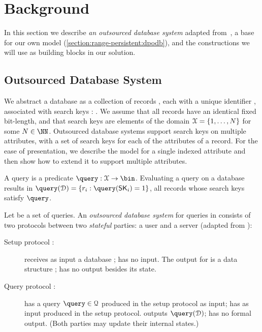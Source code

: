 \section{Background}\label{section:range-persistent:background}

	In this section we describe \emph{an outsourced database system} adapted from~\cite{generic-attacks-kellaris}, a base for our own model (\cref{section:range-persistent:dpodb}), and the constructions we will use as building blocks in our solution.

	\subsection{Outsourced Database System}

		We abstract a database as a collection of \dataSize{} records \record{}, each with a unique identifier \recordID{}, associated with search keys \searchKey{}: \databaseDef{}.
		We assume that all records have an identical fixed bit-length, and that search keys are elements of the domain $\mathcal{X} = \{ 1, \ldots, N \}$ for some $\domainSize \in \NN$.
		Outsourced database systems support search keys on multiple attributes, with a set of search keys for each of the attributes of a record.
		For the ease of presentation, we describe the model for a single indexed attribute and then show how to extend it to support multiple attributes.

		A query is a predicate $\query: \searchKeyDomain \to \bin$.
		Evaluating a query \query{} on a database \database{} results in $\query( \database ) = \{ \record_i : \query( \searchKey_i ) = 1 \}$, all records whose search keys satisfy $\query$.

		Let \querySet{} be a set of queries.
		An \emph{outsourced database system} for queries in \querySet{} consists of two protocols between two \emph{stateful} parties: a user \user{} and a server \server{} (adapted from \cite{generic-attacks-kellaris}): %
		\begin{description}
			\item[Setup protocol \protocolSetup{}:]
				\user{} receives as input a database \databaseDef{}; \server{} has no input.
				The output for \server{} is a data structure \serverDS{}; \user{} has no output besides its state.

			\item[Query protocol \protocolQuery{}:]
				\user{} has a query $\query \in \querySet$ produced in the setup protocol as input; \server{} has as input \serverDS{} produced in the setup protocol.
				\user{} outputs $\query( \database )$; \server{} has no formal output.
				(Both parties may update their internal states.)
		\end{description}

